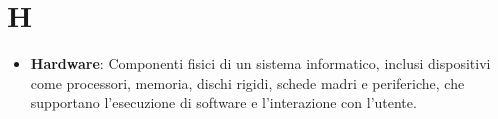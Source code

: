 \section*{H}  
\begin{itemize}
    \item \textbf{Hardware}: Componenti fisici di un sistema informatico, inclusi dispositivi come processori, memoria, dischi rigidi, schede madri e periferiche, che supportano l'esecuzione di software e l'interazione con l'utente.
\end{itemize}
